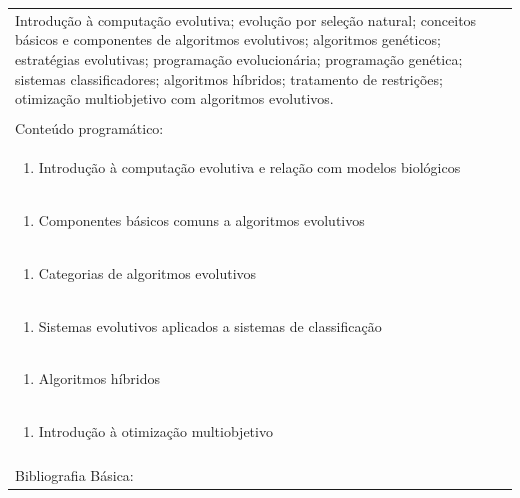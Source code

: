 \documentclass[11pt]{article}
\begin{document}
\begin{center}
\begin{longtable}{|p{4cm}|p{4cm}|p{4cm}|p{4cm}|}
\multicolumn{4}{|p{\dimexpr 16cm + 6\tabcolsep\relax}|}{Introdução à computação evolutiva; evolução por seleção natural; conceitos básicos e componentes de algoritmos evolutivos; algoritmos genéticos; estratégias evolutivas; programação evolucionária; programação genética; sistemas classificadores; algoritmos híbridos; tratamento de restrições; otimização multiobjetivo com algoritmos evolutivos.}\\
\multicolumn{4}{|p{16cm}|}{}\\
\hline
\multicolumn{4}{|p{16cm}|}{Conteúdo programático:}\\*
\multicolumn{4}{|p{\dimexpr 16cm + 6\tabcolsep\relax}|}{\begin{enumerate}[start=1]\item Introdução à computação evolutiva e relação com modelos biológicos\end{enumerate}}\\
\multicolumn{4}{|p{\dimexpr 16cm + 6\tabcolsep\relax}|}{\begin{enumerate}[start=2]\item Componentes básicos comuns a algoritmos evolutivos\end{enumerate}}\\
\multicolumn{4}{|p{\dimexpr 16cm + 6\tabcolsep\relax}|}{\begin{enumerate}[start=3]\item Categorias de algoritmos evolutivos\end{enumerate}}\\
\multicolumn{4}{|p{\dimexpr 16cm + 6\tabcolsep\relax}|}{\begin{enumerate}[start=4]\item Sistemas evolutivos aplicados a sistemas de classificação\end{enumerate}}\\
\multicolumn{4}{|p{\dimexpr 16cm + 6\tabcolsep\relax}|}{\begin{enumerate}[start=5]\item Algoritmos híbridos\end{enumerate}}\\
\multicolumn{4}{|p{\dimexpr 16cm + 6\tabcolsep\relax}|}{\begin{enumerate}[start=6]\item Introdução à otimização multiobjetivo\end{enumerate}}\\
\multicolumn{4}{|p{\dimexpr 16cm + 6\tabcolsep\relax}|}{}\\
\hline
\multicolumn{4}{|p{16cm}|}{Bibliografia Básica:}\\*

\end{longtable}
\end{center}
\end{document}
